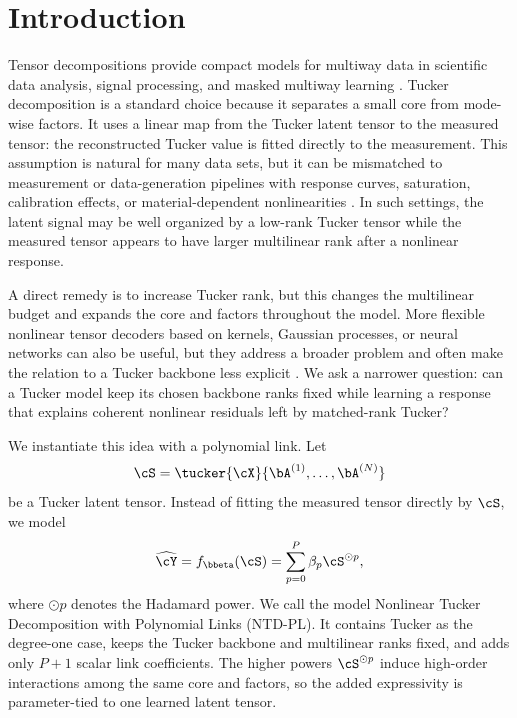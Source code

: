 \section{Introduction}

Tensor decompositions provide compact models for multiway data in scientific
data analysis, signal processing, and masked multiway learning
\citep{Kolda2009Tensor,Sidiropoulos2017TSP,Liu2013TensorCompletion,
LiuMoitra2020TensorCompletion}. Tucker decomposition is a
standard choice because it separates a small core from mode-wise factors. It
uses a linear map from the Tucker latent tensor to the measured tensor: the
reconstructed Tucker value is fitted directly to the measurement. This
assumption is natural for many data sets,
but it can be mismatched to measurement or data-generation pipelines with
response curves, saturation, calibration effects, or material-dependent
nonlinearities
\citep{Debevec1997HDR,Grossberg2004CameraResponse,
BioucasDias2012HyperspectralUnmixing,Heylen2014NonlinearUnmixing,
Luo2024LRTFR}. In such settings, the latent signal may be well organized by a
low-rank Tucker tensor while the measured tensor appears to have larger
multilinear rank after a nonlinear response.

A direct remedy is to increase Tucker rank, but this changes the multilinear
budget and expands the core and factors throughout the model. More flexible
nonlinear tensor decoders based on kernels, Gaussian processes, or neural
networks can also be useful, but they address a broader problem and often make
the relation to a Tucker backbone less explicit
\citep{xu2011infinite,zhe2016distributed,liu2017deepcp,
saragadam2024deeptensor,ahn2024neural}. We ask a narrower question: can a
Tucker model keep its chosen backbone ranks fixed while learning a response
that explains coherent nonlinear residuals left by matched-rank Tucker?

We instantiate this idea with a polynomial link. Let
\[
\cS = \tucker{\cX}{\bA^{(1)}, \ldots, \bA^{(N)}}
\]
be a Tucker latent tensor. Instead of fitting the measured tensor directly by
\(\cS\), we model
\[
\widehat{\cY} = f_{\bbeta}(\cS) = \sum_{p=0}^{P} \beta_p \cS^{\odot p},
\]
where \(\odot p\) denotes the Hadamard power. We call the model Nonlinear Tucker Decomposition
with Polynomial Links (NTD-PL). It contains Tucker as the degree-one case,
keeps the Tucker backbone and multilinear ranks fixed, and adds only \(P+1\)
scalar link coefficients. The higher powers \(\cS^{\odot p}\) induce
high-order interactions among the same core and factors, so the added
expressivity is parameter-tied to one learned latent tensor.

